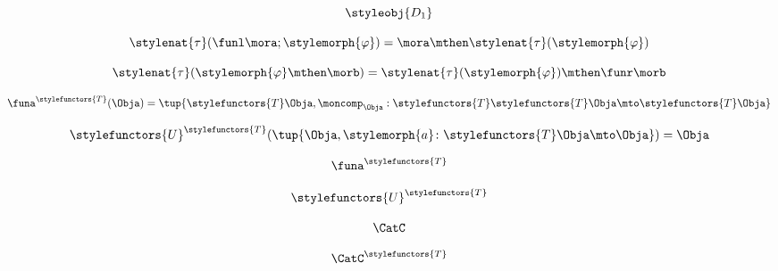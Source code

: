 {\begin{forslides}
        \begin{equation}
            \label{eq:slides_adjunctions_77}
            \styleobj{D_1}
        \end{equation}

        \begin{equation}
            \label{eq:slides_adjunctions_78}
            \stylenat{\tau} (\funl \mora; \stylemorph{\varphi}) = \mora \mthen \stylenat{\tau}(\stylemorph{\varphi})
        \end{equation}

        \begin{equation}
            \label{eq:slides_adjunctions_79}
            \stylenat{\tau} (\stylemorph{\varphi} \mthen \morb) =  \stylenat{\tau}(\stylemorph{\varphi}) \mthen \funr \morb
        \end{equation}

        \begin{equation}
            \label{eq:slides_adjunctions_80}
            \funa^{\stylefunctors{T}}(\Obja) = \tup{ \stylefunctors{T} \Obja, \moncomp_{\Obja} : \stylefunctors{T} \stylefunctors{T} \Obja \mto \stylefunctors{T} \Obja}
        \end{equation}

        \begin{equation}
            \label{eq:slides_adjunctions_81}
            \stylefunctors{U}^{\stylefunctors{T}}( \tup{\Obja, \stylemorph{a} \colon \stylefunctors{T} \Obja \mto \Obja}) = \Obja
        \end{equation}

        \begin{equation}
            \label{eq:slides_adjunctions_82}
            \funa^{\stylefunctors{T}}
        \end{equation}

        \begin{equation}
            \label{eq:slides_adjunctions_83}
            \stylefunctors{U}^{\stylefunctors{T}}
        \end{equation}

        \begin{equation}
            \label{eq:slides_adjunctions_84}
            \CatC
        \end{equation}

        \begin{equation}
            \label{eq:slides_adjunctions_85}
            \CatC^{\stylefunctors{T}}
        \end{equation}


\end{forslides}}
